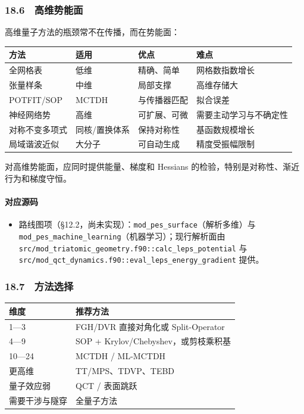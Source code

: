 \documentclass[
]{ctexbook}
\providecommand{\tightlist}{%
  \setlength{\itemsep}{0pt}\setlength{\parskip}{0pt}}
\begin{document}
\hypertarget{ux9ad8ux7ef4ux52bfux80fdux9762}{%
\subsubsection{18.6　高维势能面}\label{ux9ad8ux7ef4ux52bfux80fdux9762}}

高维量子方法的瓶颈常不在传播，而在势能面：

\begin{longtable}[]{@{}llll@{}}
\toprule
方法 & 适用 & 优点 & 难点\tabularnewline
\midrule
\endhead
全网格表 & 低维 & 精确、简单 & 网格数指数增长\tabularnewline
张量样条 & 中维 & 局部支撑 & 高维存储大\tabularnewline
POTFIT/SOP & MCTDH & 与传播器匹配 & 拟合误差\tabularnewline
神经网络势 & 高维 & 可扩展、可微 & 需要主动学习与不确定性\tabularnewline
对称不变多项式 & 同核/置换体系 & 保持对称性 &
基函数规模增长\tabularnewline
局域谐波近似 & 大分子 & 可自动生成 & 精度受振幅限制\tabularnewline
\bottomrule
\end{longtable}

对高维势能面，应同时提供能量、梯度和 Hessians
的检验，特别是对称性、渐近行为和梯度守恒。

\hypertarget{ux5bf9ux5e94ux6e90ux7801-85}{%
\paragraph{对应源码}\label{ux5bf9ux5e94ux6e90ux7801-85}}

\begin{itemize}
\tightlist
\item
  路线图项（§12.2，尚未实现）：\texttt{mod\_pes\_surface}（解析多维）与
  \texttt{mod\_pes\_machine\_learning}（机器学习）；现行解析面由
  \texttt{src/mod\_triatomic\_geometry.f90::calc\_leps\_potential} 与
  \texttt{src/mod\_qct\_dynamics.f90::eval\_leps\_energy\_gradient}
  提供。
\end{itemize}

\hypertarget{ux65b9ux6cd5ux9009ux62e9}{%
\subsubsection{18.7　方法选择}\label{ux65b9ux6cd5ux9009ux62e9}}

\begin{longtable}[]{@{}ll@{}}
\toprule
维度 & 推荐方法\tabularnewline
\midrule
\endhead
1---3 & FGH/DVR 直接对角化或 Split-Operator\tabularnewline
4---9 & SOP + Krylov/Chebyshev，或剪枝乘积基\tabularnewline
10---24 & MCTDH / ML-MCTDH\tabularnewline
更高维 & TT/MPS、TDVP、TEBD\tabularnewline
量子效应弱 & QCT / 表面跳跃\tabularnewline
需要干涉与隧穿 & 全量子方法\tabularnewline
\bottomrule
\end{longtable}
\end{document}
